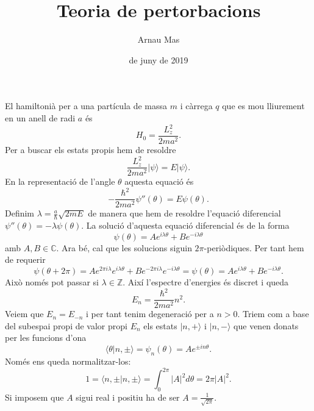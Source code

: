 \documentclass[12pt]{article}
\title{\sffamily {\bfseries Entrega 4:} Teoria de pertorbacions}
\author{\sffamily Arnau Mas}
\date{\sffamily 17 de juny de 2019}
\numberwithin{table}{section}
\numberwithin{figure}{section}
\numberwithin{equation}{section}
\newcommand{\Z}{\mathbb{Z}}
\newcommand{\C}{\mathbb{C}}
\newcommand{\abs}[1]{\lvert #1 \rvert}
\newcommand{\ket}[1]{\vert {#1} \rangle}
\newcommand{\braket}[2]{\langle {#1} \vert {#2} \rangle}
\begin{document}
\maketitle
El hamiltonià per a una partícula de massa \( m \) i càrrega \( q \) que es mou lliurement en un anell de radi \( a \) és
\begin{equation*}
	H_0 = \frac{L_z^2}{2ma^2}.
\end{equation*}
Per a buscar els estats propis hem de resoldre
\begin{equation*}
	\frac{L_z^2}{2ma^2}\ket{\psi} = E \ket{\psi}.
\end{equation*}
En la representació de l'angle \( \theta \) aquesta equació és
\begin{equation*}
	-\frac{\hbar^2}{2ma^2}\psi''(\theta) = E \psi(\theta).
\end{equation*}
Definim \( \lambda = \frac{a}{\hbar}\sqrt{2mE} \) de manera que hem de resoldre l'equació diferencial \( \psi''(\theta) = -\lambda \psi(\theta) \). La solució d'aquesta equació diferencial és de la forma
\begin{equation*}
	\psi(\theta) = Ae^{i\lambda\theta} + Be^{-i\lambda\theta}
\end{equation*}
amb \( A,B \in \C \). Ara bé, cal que les solucions siguin \( 2\pi \)-periòdiques. Per tant hem de requerir
\begin{equation*}
	\psi(\theta + 2\pi) = Ae^{2\pi i \lambda}e^{i\lambda\theta} + Be^{-2\pi i \lambda}e^{-i\lambda\theta} = \psi(\theta) = Ae^{i\lambda\theta} + Be^{-i\lambda\theta}.
\end{equation*}
Això només pot passar si \( \lambda \in \Z \). Així l'espectre d'energies és discret i queda
\begin{equation*}
	E_n = \frac{\hbar^2}{2ma^2}n^2.
\end{equation*}
Veiem que \( E_n = E_{-n} \) i per tant tenim degeneració per a \( n > 0 \). Triem com a base del subespai propi de valor propi \( E_n \) els estats \( \ket{n, +} \) i \( \ket{n, -} \) que venen donats per les funcions d'ona
\begin{equation*}
	\braket{\theta}{n, \pm} = \psi_n(\theta) = Ae^{\pm in\theta}.
\end{equation*}
Només ens queda normalitzar-los:
\begin{equation*}
 1 = \braket{n,\pm}{n,\pm} = \int_0^{2\pi} \abs{A}^2 d\theta = 2\pi\abs{A}^2.
\end{equation*}
Si imposem que \( A \) sigui real i positiu ha de ser \( A = \frac{1}{\sqrt{2\pi}} \). 
\end{document}
